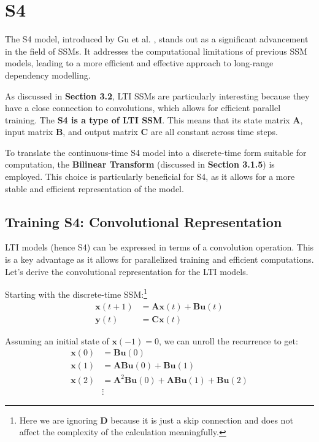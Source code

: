 \documentclass[12pt,a4paper]{report}
\begin{document}
\section{S4}

The S4 model, introduced by Gu et al. \cite{s4}, stands out as a significant advancement in the field of SSMs. It addresses the computational limitations of previous SSM models, leading to a more efficient and effective approach to long-range dependency modelling.

\medskip

As discussed in \textbf{Section 3.2}, LTI SSMs are particularly interesting because they have a close connection to convolutions, which allows for efficient parallel training. The \textbf{S4 is a type of LTI SSM}. This means that its state matrix $\mathbf{A}$, input matrix $\mathbf{B}$, and output matrix $\mathbf{C}$ are all constant across time steps.

\medskip

To translate the continuous-time S4 model into a discrete-time form suitable for computation, the \textbf{Bilinear Transform} (discussed in \textbf{Section 3.1.5}) is employed. This choice is particularly beneficial for S4, as it allows for a more stable and efficient representation of the model.

\subsection{Training S4: Convolutional Representation}
LTI models (hence S4) can be expressed in terms of a convolution operation. This is a key advantage as it allows for parallelized training and efficient computations. Let's derive the convolutional representation for the LTI models.

Starting with the discrete-time SSM:\footnote{Here we are ignoring $\mathbf{D}$ because it is just a skip connection and does not affect the complexity of the calculation meaningfully.}
\[
\begin{aligned}
\mathbf{x}(t+1) &= \mathbf{A}\mathbf{x}(t) + \mathbf{B}\mathbf{u}(t) \\
\mathbf{y}(t) &= \mathbf{C}\mathbf{x}(t)
\end{aligned}
\]

Assuming an initial state of $\mathbf{x}(-1) = 0$, we can unroll the recurrence to get:
\[
\begin{aligned}
\mathbf{x}(0) &= \mathbf{B}\mathbf{u}(0) \\
\mathbf{x}(1) &= \mathbf{A}\mathbf{B}\mathbf{u}(0) + \mathbf{B}\mathbf{u}(1) \\
\mathbf{x}(2) &= \mathbf{A}^2\mathbf{B}\mathbf{u}(0) + \mathbf{A}\mathbf{B}\mathbf{u}(1) + \mathbf{B}\mathbf{u}(2) \\
&\vdots
\end{aligned}
\]
\end{document}
